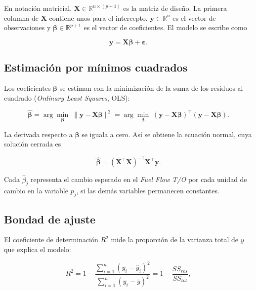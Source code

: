 En notación matricial, $\mathbf{X}\in\mathbb{R}^{n\times(p+1)}$ es la matriz de diseño. La primera columna de $\mathbf{X}$ contiene unos para el intercepto. $\mathbf{y}\in\mathbb{R}^n$ es el vector de observaciones y $\boldsymbol{\beta}\in\mathbb{R}^{p+1}$ es el vector de coeficientes. El modelo se escribe como

\begin{equation}
\mathbf{y} = \mathbf{X}\boldsymbol{\beta} + \boldsymbol{\varepsilon}.
\label{eq:regresion_matricial}
\end{equation}

\subsection{Estimación por mínimos cuadrados}

Los coeficientes $\boldsymbol{\beta}$ se estiman con la minimización de la suma de los residuos al cuadrado (\textit{Ordinary Least Squares}, OLS):

\begin{equation}
\hat{\boldsymbol{\beta}} = \arg\min_{\boldsymbol{\beta}} \; \lVert \mathbf{y}-\mathbf{X}\boldsymbol{\beta} \rVert^2 = \arg\min_{\boldsymbol{\beta}} \; (\mathbf{y}-\mathbf{X}\boldsymbol{\beta})^\top(\mathbf{y}-\mathbf{X}\boldsymbol{\beta}).
\label{eq:ols_objetivo}
\end{equation}

La derivada respecto a $\boldsymbol{\beta}$ se iguala a cero. Así se obtiene la ecuación normal, cuya solución cerrada es

\begin{equation}
\hat{\boldsymbol{\beta}} = (\mathbf{X}^\top\mathbf{X})^{-1}\mathbf{X}^\top\mathbf{y}.
\label{eq:ols_solucion}
\end{equation}

Cada $\hat{\beta}_j$ representa el cambio esperado en el \textit{Fuel Flow T/O} por cada unidad de cambio en la variable $p_j$, si las demás variables permanecen constantes.

\subsection{Bondad de ajuste}

El coeficiente de determinación $R^2$ mide la proporción de la varianza total de $y$ que explica el modelo:

\begin{equation}
R^2 = 1 - \frac{\sum_{i=1}^n (y_i - \hat{y}_i)^2}{\sum_{i=1}^n (y_i - \bar{y})^2} = 1 - \frac{SS_{res}}{SS_{tot}},
\label{eq:r2}
\end{equation}

